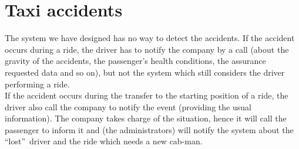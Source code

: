 \documentclass[\mainpath/main]{subfiles}
\begin{document}
\section{Taxi accidents}
The system we have designed has no way to detect the accidents. If the accident occurs during a ride, the driver has to notify the company by a call (about the gravity of the accidents, the passenger's health conditions, the assurance requested data and so on), but not the system which still considers the driver performing a ride.\\
If the accident occurs during the transfer to the starting position of a ride, the driver also call the company to notify the event (providing the usual information). The company takes charge of the situation, hence it will call the passenger to inform it and (the administrators) will notify the system about the \textquotedblleft lost\textquotedblright\ driver and the ride which needs a new cab-man.
\end{document}
